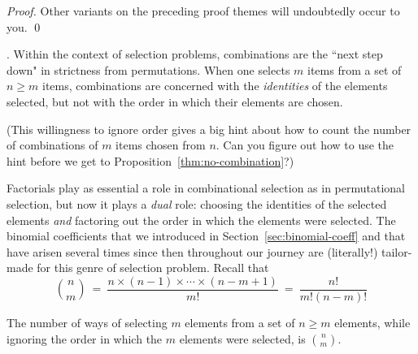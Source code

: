 \begin{proof}
\medskip

\noindent
Other variants on the preceding proof themes will undoubtedly occur to you.   \qed
\end{proof}


\medskip

.
Within the context of selection problems, combinations are the ``next step down" in strictness from permutations.  When one selects $m$ items from a set of $n \geq m$ items, combinations are concerned with the {\em identities} of the elements selected, but not with the order in which their elements are chosen.

\smallskip

\noindent (This willingness to ignore order gives a big hint about how to count the number of
combinations of $m$ items chosen from $n$.  Can you figure out how to use the hint before
we get to Proposition~\ref{thm:no-combination}?)

\medskip

Factorials play as essential a role in combinational selection as in permutational selection, but
now it plays a {\em dual} role: choosing the identities of the selected elements {\em and} factoring out the order in which the elements were selected.  The binomial coefficients that we introduced in Section~\ref{sec:binomial-coeff} and that have arisen several times since then
throughout our journey are (literally!) tailor-made for this genre of selection problem.  Recall that
\[ {n \choose m} \ = \ \frac{n \times (n-1) \times \cdots \times (n-m+1)}{m!} \ = \  \frac{n!}{m!(n-m)!} \]

\begin{prop}
\label{thm:no-combination}
The number of ways of selecting $m$ elements from a set of $n \geq m$ elements, while ignoring the order in which the $m$ elements were selected, is $\displaystyle {n \choose m}$.
\end{prop}

